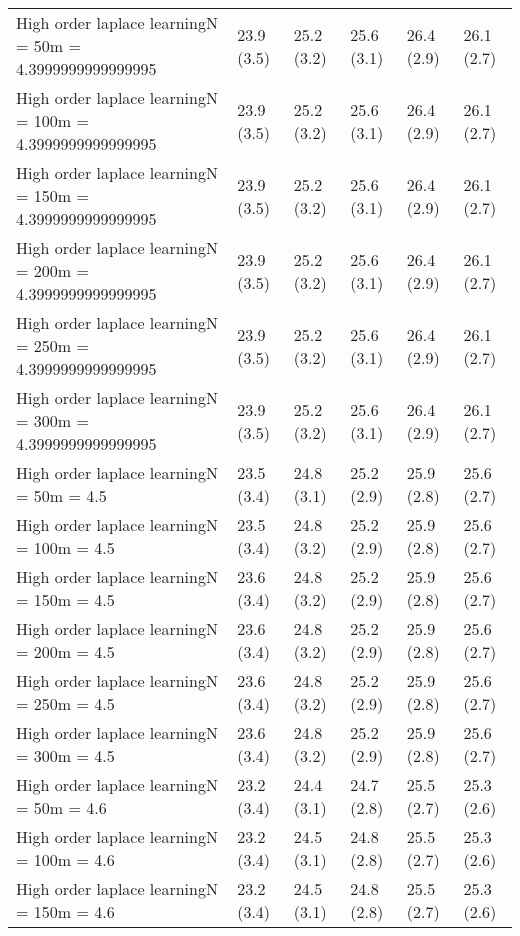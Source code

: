 \documentclass{article}
\begin{document}
\begin{table*}[t!]
\begin{center}
\begin{small}
\begin{sc}
\begin{tabular}{llllll}
High order laplace learningN = 50m = 4.3999999999999995&23.9 (3.5)      &25.2 (3.2)      &25.6 (3.1)      &26.4 (2.9)      &26.1 (2.7)      \\
High order laplace learningN = 100m = 4.3999999999999995&23.9 (3.5)      &25.2 (3.2)      &25.6 (3.1)      &26.4 (2.9)      &26.1 (2.7)      \\
High order laplace learningN = 150m = 4.3999999999999995&23.9 (3.5)      &25.2 (3.2)      &25.6 (3.1)      &26.4 (2.9)      &26.1 (2.7)      \\
High order laplace learningN = 200m = 4.3999999999999995&23.9 (3.5)      &25.2 (3.2)      &25.6 (3.1)      &26.4 (2.9)      &26.1 (2.7)      \\
High order laplace learningN = 250m = 4.3999999999999995&23.9 (3.5)      &25.2 (3.2)      &25.6 (3.1)      &26.4 (2.9)      &26.1 (2.7)      \\
High order laplace learningN = 300m = 4.3999999999999995&23.9 (3.5)      &25.2 (3.2)      &25.6 (3.1)      &26.4 (2.9)      &26.1 (2.7)      \\
High order laplace learningN = 50m = 4.5&23.5 (3.4)      &24.8 (3.1)      &25.2 (2.9)      &25.9 (2.8)      &25.6 (2.7)      \\
High order laplace learningN = 100m = 4.5&23.5 (3.4)      &24.8 (3.2)      &25.2 (2.9)      &25.9 (2.8)      &25.6 (2.7)      \\
High order laplace learningN = 150m = 4.5&23.6 (3.4)      &24.8 (3.2)      &25.2 (2.9)      &25.9 (2.8)      &25.6 (2.7)      \\
High order laplace learningN = 200m = 4.5&23.6 (3.4)      &24.8 (3.2)      &25.2 (2.9)      &25.9 (2.8)      &25.6 (2.7)      \\
High order laplace learningN = 250m = 4.5&23.6 (3.4)      &24.8 (3.2)      &25.2 (2.9)      &25.9 (2.8)      &25.6 (2.7)      \\
High order laplace learningN = 300m = 4.5&23.6 (3.4)      &24.8 (3.2)      &25.2 (2.9)      &25.9 (2.8)      &25.6 (2.7)      \\
High order laplace learningN = 50m = 4.6&23.2 (3.4)      &24.4 (3.1)      &24.7 (2.8)      &25.5 (2.7)      &25.3 (2.6)      \\
High order laplace learningN = 100m = 4.6&23.2 (3.4)      &24.5 (3.1)      &24.8 (2.8)      &25.5 (2.7)      &25.3 (2.6)      \\
High order laplace learningN = 150m = 4.6&23.2 (3.4)      &24.5 (3.1)      &24.8 (2.8)      &25.5 (2.7)      &25.3 (2.6)      \\

\end{tabular}
\end{sc}
\end{small}
\end{center}
\end{table*}
\end{document}
